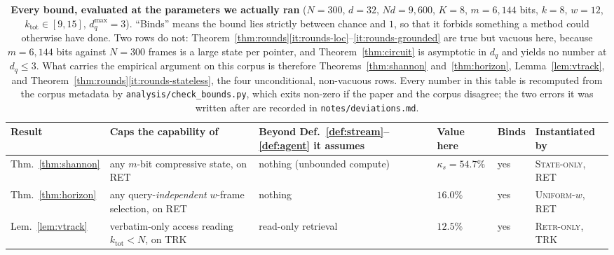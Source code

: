\documentclass[10pt]{article}
\newcommand{\VN}{300}
\newcommand{\Vd}{32}
\newcommand{\VK}{8}
\newcommand{\VNd}{9{,}600}
\newcommand{\VmBits}{6{,}144}
\newcommand{\VkappaSpct}{54.7}
\newcommand{\VoneOverK}{12.5}
\theoremstyle{definition}
\theoremstyle{plain}
\begin{document}
\begin{table}[!t]
\centering\small\setlength{\tabcolsep}{4pt}
\caption{\textbf{Every bound, evaluated at the parameters we actually ran}
($N{=}\VN$, $d{=}\Vd$, $Nd{=}\VNd$, $K{=}\VK$, $m{=}\VmBits$ bits, $k{=}8$, $w{=}12$,
$k_{\mathrm{tot}}{\in}[9,15]$, $d_q^{\max}{=}3$). ``Binds'' means the bound lies strictly
between chance and $1$, so that it forbids something a method could otherwise have done.
Two rows do not: Theorem~\ref{thm:rounds}\ref{it:rounds-loc}--\ref{it:rounds-grounded} are
true but vacuous here, because $m{=}\VmBits$ bits against $N{=}\VN$ frames is a large state
per pointer, and Theorem~\ref{thm:circuit} is asymptotic in $d_q$ and yields no number at
$d_q\le3$. What carries the empirical argument on this corpus is therefore
Theorems~\ref{thm:shannon} and~\ref{thm:horizon}, Lemma~\ref{lem:vtrack}, and
Theorem~\ref{thm:rounds}\ref{it:rounds-stateless}, the four unconditional,
non-vacuous rows. Every number in this table is recomputed from the corpus metadata by
\texttt{analysis/check\_bounds.py}, which exits non-zero if the paper and the corpus disagree;
the two errors it was written after are recorded in \texttt{notes/deviations.md}.}
\label{tab:scope}
\begin{tabular}{@{}>{\raggedright\arraybackslash}p{2.0cm}>{\raggedright\arraybackslash}p{4.1cm}>{\raggedright\arraybackslash}p{3.0cm}>{\raggedright\arraybackslash}p{1.9cm}p{0.9cm}>{\raggedright\arraybackslash}p{3.1cm}@{}}
\toprule
Result & Caps the capability of & Beyond Def.~\ref{def:stream}--\ref{def:agent} it assumes
& Value here & Binds & Instantiated by \\
\midrule
Thm.~\ref{thm:shannon} & any $m$-bit compressive state, on RET & nothing (unbounded compute)
& $\kappa_s=\VkappaSpct\%$ & yes & \textsc{State-only}, RET \\
Thm.~\ref{thm:horizon} & any query-\emph{independent} $w$-frame selection, on RET & nothing
& $16.0\%$ & yes & \textsc{Uniform-}$w$, RET \\
Lem.~\ref{lem:vtrack} & verbatim-only access reading $k_{\mathrm{tot}}{<}N$, on TRK
& read-only retrieval & $\VoneOverK\%$ & yes & \textsc{Retr-only}, TRK \\

\end{tabular}
\end{table}
\end{document}
